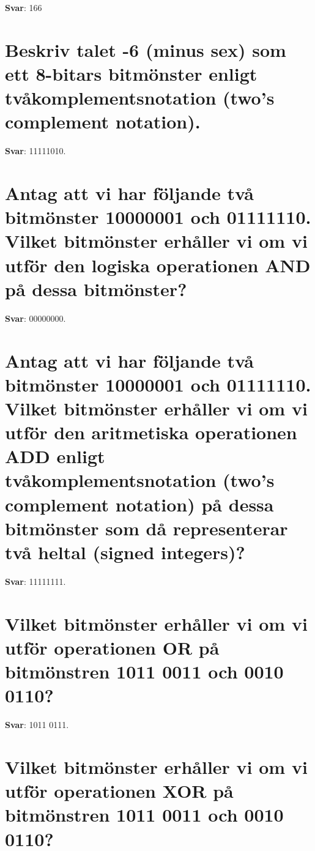 \documentclass[a4paper,11pt,oneside]{book}
\begin{document}
\begin{sloppypar}
\label{q:401:sa:sv:True}

\textbf{Svar}: 166



\section{Beskriv talet -6 (minus sex) som ett 8-bitars bitm\"onster enligt tv\r{a}komplementsnotation (two{\textquoteright}s complement notation).}

\label{q:402:sa:sv:True}

\textbf{Svar}: 11111010.



\section{Antag att vi har f\"oljande tv\r{a} bitm\"onster 10000001 och 01111110. Vilket bitm\"onster erh\r{a}ller vi om vi utf\"or den logiska operationen AND p\r{a} dessa bitm\"onster?}

\label{q:403:sa:sv:True}

\textbf{Svar}: 00000000.



\section{Antag att vi har f\"oljande tv\r{a} bitm\"onster 10000001 och 01111110. Vilket bitm\"onster erh\r{a}ller vi om vi utf\"or den aritmetiska operationen ADD enligt tv\r{a}komplementsnotation (two{\textquoteright}s complement notation) p\r{a} dessa bitm\"onster som d\r{a} representerar tv\r{a} heltal (signed integers)?}

\label{q:404:sa:sv:True}

\textbf{Svar}: 11111111.



\section{Vilket bitm\"onster erh\r{a}ller vi om vi utf\"or operationen OR p\r{a} bitm\"onstren 1011 0011 och 0010 0110?}

\label{q:405:sa:sv:True}

\textbf{Svar}: 1011 0111.



\section{Vilket bitm\"onster erh\r{a}ller vi om vi utf\"or operationen XOR p\r{a} bitm\"onstren 1011 0011 och 0010 0110?}


\end{sloppypar}
\end{document}
